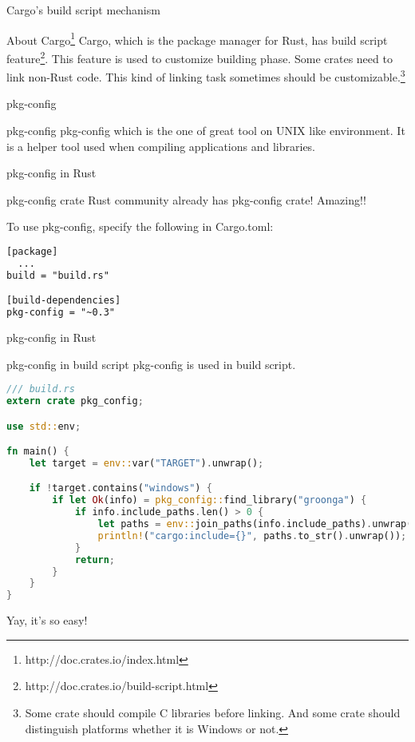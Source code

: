 \documentclass[12pt, unicode]{beamer}
\begin{document}
\begin{frame}{Cargo's build script mechanism}
\begin{block}{About Cargo\footnote[frame]{http://doc.crates.io/index.html}}
  Cargo, which is the package manager for Rust, has build script feature\footnote[frame]{http://doc.crates.io/build-script.html}.
  \newline
  This feature is used to customize building phase.
  \newline
  Some crates need to link non-Rust code. This kind of linking task sometimes should be customizable.\footnote[frame]{Some crate should compile C libraries before linking. And some crate should distinguish platforms whether it is Windows or not.}
\end{block}
\end{frame}

\begin{frame}{pkg-config}
  \begin{block}{pkg-config}
    pkg-config which is the one of great tool on UNIX like environment.
    \newline
    It is a helper tool used when compiling applications and libraries.
  \end{block}
\end{frame}

\begin{frame}[fragile]{pkg-config in Rust}
  \begin{block}{pkg-config crate}
    Rust community already has pkg-config crate! Amazing!!
  \end{block}
  To use pkg-config, specify the following in Cargo.toml:
\begin{lstlisting}[language={XML},basicstyle=\ttfamily\Small]
[package]
  ...
build = "build.rs"

[build-dependencies]
pkg-config = "~0.3"
\end{lstlisting}
\end{frame}

\newcommand\XSmall{\fontsize{7}{7}\selectfont}
\begin{frame}[fragile]{pkg-config in Rust}
  \begin{block}{pkg-config in build script}
    pkg-config is used in build script.
  \end{block}
  \begin{lstlisting}[language={Rust},basicstyle=\ttfamily\XSmall]
/// build.rs
extern crate pkg_config;

use std::env;

fn main() {
    let target = env::var("TARGET").unwrap();

    if !target.contains("windows") {
        if let Ok(info) = pkg_config::find_library("groonga") {
            if info.include_paths.len() > 0 {
                let paths = env::join_paths(info.include_paths).unwrap();
                println!("cargo:include={}", paths.to_str().unwrap());
            }
            return;
        }
    }
}
  \end{lstlisting}
  Yay, it's so easy!
\end{frame}
\end{document}
